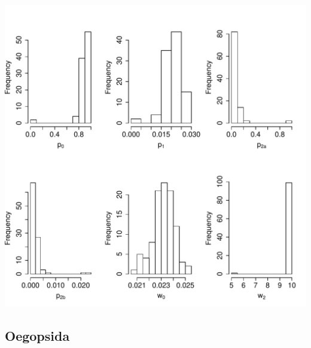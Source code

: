 \documentclass[12pt,letterpaper]{article}\usepackage[]{graphicx}\usepackage[]{color}
\makeatletter
\def\maxwidth{ %
  \ifdim\Gin@nat@width>\linewidth
    \linewidth
  \else
    \Gin@nat@width
  \fi
}
\newenvironment{knitrout}{}{} %
\makeatother
\begin{document}
\begin{knitrout}
\color{fgcolor}

{\centering \includegraphics[width=\maxwidth]{./figures/OegopBathy_plots-1} 

}



\end{knitrout}

\clearpage

\subsection*{Oegopsida}
\end{document}

